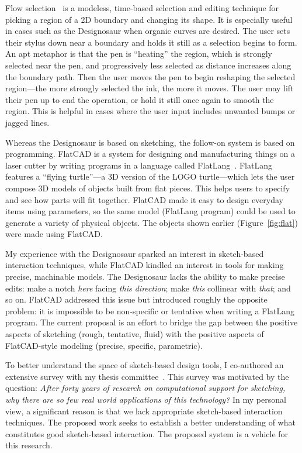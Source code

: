 \documentclass[11pt]{article}
\begin{document}
Flow selection~\cite{johnson-flow-selection} is a modeless, time-based
selection and editing technique for picking a region of a 2D boundary
and changing its shape. It is especially useful in cases such as the
Designosaur when organic curves are desired. The user sets their
stylus down near a boundary and holds it still as a selection begins
to form. An apt metaphor is that the pen is ``heating'' the region,
which is strongly selected near the pen, and progressively less
selected as distance increases along the boundary path. Then the user
moves the pen to begin reshaping the selected region---the more
strongly selected the ink, the more it moves. The user may lift their
pen up to end the operation, or hold it still once again to smooth the
region. This is helpful in cases where the user input includes
unwanted bumps or jagged lines.

Whereas the Designosaur is based on sketching, the follow-on system is
based on programming. FlatCAD is a system for designing and
manufacturing things on a laser cutter by writing programs in a
language called FlatLang~\cite{johnson-flatcad}.  FlatLang features a
``flying turtle''---a 3D version of the LOGO turtle---which lets the
user compose 3D models of objects built from flat pieces. This helps
users to specify and see how parts will fit together. FlatCAD made it
easy to design everyday items using parameters, so the same model
(FlatLang program) could be used to generate a variety of physical
objects. The objects shown earlier (Figure~\ref{fig:flat}) were made
using FlatCAD.

My experience with the Designosaur sparked an interest in sketch-based
interaction techniques, while FlatCAD kindled an interest in tools for
making precise, machinable models. The Designosaur lacks the ability
to make precise edits: make a notch \textit{here} facing \textit{this
  direction}; make \textit{this} collinear with \textit{that}; and so
on. FlatCAD addressed this issue but introduced roughly the opposite
problem: it is impossible to be non-specific or tentative when writing
a FlatLang program. The current proposal is an effort to bridge the
gap between the positive aspects of sketching (rough, tentative,
fluid) with the positive aspects of FlatCAD-style modeling (precise,
specific, parametric).

To better understand the space of sketch-based design tools, I
co-authored an extensive survey with my thesis
committee~\cite{johnson-sketch-review}. This survey was motivated by
the question: \textit{After forty years of research on computational
  support for sketching, why there are so few real world applications
  of this technology?} In my personal view, a significant reason is
that we lack appropriate sketch-based interaction techniques. The
proposed work seeks to establish a better understanding of what
constitutes good sketch-based interaction. The proposed system is a
vehicle for this research.
\end{document}
